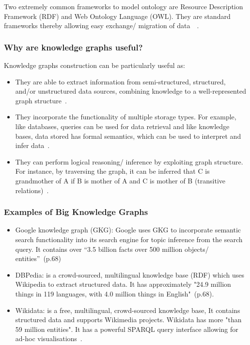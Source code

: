 Two extremely common frameworks to model ontology are Resource Description Framework (RDF) and Web Ontology Language (OWL). They are standard frameworks thereby allowing easy exchange/ migration of data~\cite{4_towards_kg}~\cite{retrospective_kg}.


\subsubsection{Why are knowledge graphs useful? }

Knowledge graphs construction can be particularly useful as: 

\begin{itemize}
\item They are able to extract information from semi-structured, structured, and/or unstructured data sources, combining knowledge to a well-represented graph structure~\cite{retrospective_kg}. 

\item They incorporate the functionality of multiple storage types. For example, like databases, queries can be used for data retrieval and like knowledge bases, data stored has formal semantics, which can be used to interpret and infer data~\cite{2_guide_kg}. 

\item They can perform logical reasoning/ inference by exploiting graph structure. For instance, by traversing the graph, it can be inferred that C is grandmother of A if B is mother of A and C is mother of B (transitive relations)~\cite{2_guide_kg}. 
\end{itemize}  


\subsubsection{Examples of Big Knowledge Graphs}

\begin{itemize}
\item Google knowledge graph (GKG):  Google uses GKG to incorporate semantic search functionality into its search engine for topic inference from the search query. It contains over ``3.5
billion facts over 500 million objects/ entities''~\cite{retrospective_kg}(p.68)

\item DBPedia: is a crowd-sourced, multilingual knowledge base (RDF) which uses Wikipedia to extract structured data. It has approximately "24.9 million things in 119 languages, with 4.0 million things in English"~\cite{retrospective_kg}(p.68).

\item Wikidata: is a free, multilingual, crowd-sourced
knowledge base, It contains structured data and supports Wikimedia projects. Wikidata has more "than 59 million entities". It has a powerful SPARQL query interface allowing for ad-hoc visualisations~\cite{ieee_named_entity}. 

\end{itemize}

